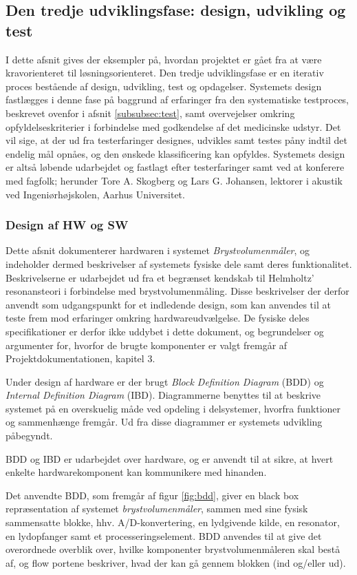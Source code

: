 \subsection{Den tredje udviklingsfase: design, udvikling og test} 
I dette afsnit gives der eksempler på, hvordan projektet er gået fra at være kravorienteret til løsningsorienteret.
Den tredje udviklingsfase er en iterativ proces bestående af design, udvikling, test og opdagelser. Systemets design fastlægges i denne fase på baggrund af erfaringer fra den systematiske testproces, beskrevet ovenfor i afsnit  \ref{subsubsec:test}, samt overvejelser omkring opfyldelseskriterier i forbindelse med godkendelse af det medicinske udstyr. Det vil sige, at der ud fra testerfaringer designes, udvikles samt testes påny indtil det endelig mål opnåes, og den ønskede klassificering kan opfyldes. Systemets design er altså løbende udarbejdet og fastlagt efter testerfaringer samt ved at konferere med fagfolk; herunder Tore A. Skogberg og Lars G. Johansen, lektorer i akustik ved Ingeniørhøjskolen, Aarhus Universitet.
\subsubsection{Design af HW og SW}

Dette afsnit dokumenterer hardwaren i systemet \textit{Brystvolumenmåler}, og indeholder dermed beskrivelser af systemets fysiske dele samt deres funktionalitet. Beskrivelserne er udarbejdet ud fra et begrænset kendskab til Helmholtz' resonansteori i forbindelse med brystvolumenmåling. Disse beskrivelser der derfor anvendt som udgangspunkt for et indledende design, som kan anvendes til at teste frem mod erfaringer omkring hardwareudvælgelse. De fysiske deles specifikationer er derfor ikke uddybet i dette dokument, og begrundelser og argumenter for, hvorfor de brugte komponenter er valgt fremgår af Projektdokumentationen, kapitel 3. 

Under design af hardware er der brugt \textit{Block Definition Diagram} (BDD) og \textit{Internal Definition Diagram} (IBD). Diagrammerne benyttes til at beskrive systemet på en overskuelig måde ved opdeling i delsystemer, hvorfra funktioner og sammenhænge fremgår. Ud fra disse diagrammer er systemets udvikling påbegyndt. 

BDD og IBD er udarbejdet over hardware, og er anvendt til at sikre, at hvert enkelte hardwarekomponent kan kommunikere med hinanden. 

Det anvendte BDD, som fremgår af figur \ref{fig:bdd}, giver en black box repræsentation af systemet \textit{brystvolumenmåler}, sammen med sine fysisk sammensatte blokke, hhv. A/D-konvertering, en lydgivende kilde, en resonator, en lydopfanger samt et processeringselement. BDD anvendes til at give det overordnede overblik over, hvilke komponenter brystvolumenmåleren skal bestå af, og flow portene beskriver, hvad der kan gå gennem blokken (ind og/eller ud). 
    
